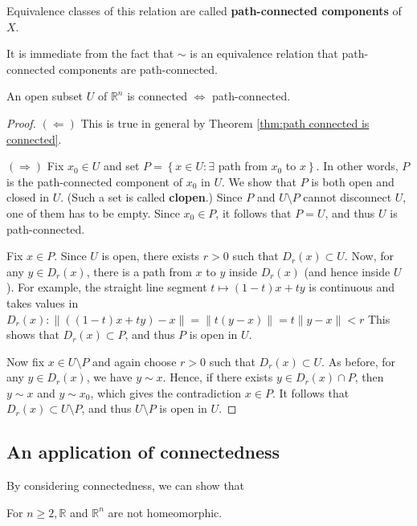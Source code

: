 \documentclass[a4paper,11pt]{article}
\begin{document}
\begin{definition}
    Equivalence classes of this relation are called \textbf{path-connected components} of $X$. 
\end{definition}
\begin{note}
    It is immediate from the fact that $\sim$ is an equivalence relation that path-connected components are path-connected.
\end{note}

\begin{theorem}\label{thm:Rn connected iff path-connected}
    An open subset $U$ of $\mathbb{R}^{n}$ is connected $\Longleftrightarrow$ path-connected.
\end{theorem}
\begin{proof}
    $(\Longleftarrow)$ This is true in general by Theorem \ref{thm:path connected is connected}.

$(\Longrightarrow)$ Fix $x_{0} \in U$ and set $P=\left\{x \in U: \exists\right.$ path from $x_{0}$ to $\left.x\right\}$. In other words, $P$ is the path-connected component of $x_{0}$ in $U$. We show that $P$ is both open and closed in $U$. (Such a set is called \textbf{clopen}.) Since $P$ and $U \setminus P$ cannot disconnect $U$, one of them has to be empty. Since $x_{0} \in P$, it follows that $P=U$, and thus $U$ is path-connected.

Fix $x \in P$. Since $U$ is open, there exists $r>0$ such that $D_{r}(x) \subset U$. Now, for any $y \in D_{r}(x)$, there is a path from $x$ to $y$ inside $D_{r}(x)$ (and hence inside $U$ ). For example, the straight line segment $t \mapsto(1-t) x+t y$ is continuous and takes values in $D_{r}(x):\|((1-t) x+t y)-x\|=\|t(y-x)\|=t\|y-x\|<r$ This shows that $D_{r}(x) \subset P$, and thus $P$ is open in $U$.

Now fix $x \in U \setminus P$ and again choose $r>0$ such that $D_{r}(x) \subset U$. As before, for any $y \in D_{r}(x)$, we have $y \sim x$. Hence, if there exists $y \in D_{r}(x) \cap P$, then $y \sim x$ and $y \sim x_{0}$, which gives the contradiction $x \in P$. It follows that $D_{r}(x) \subset U \setminus P$, and thus $U \setminus P$ is open in $U$.
\end{proof}

\subsection{An application of connectedness}
By considering connectedness, we can show that
\begin{theorem}\label{th,:R, Rn not homeo}
    For $n \geqslant 2, \mathbb{R}$ and $\mathbb{R}^{n}$ are not homeomorphic.
\end{theorem}
\end{document}

